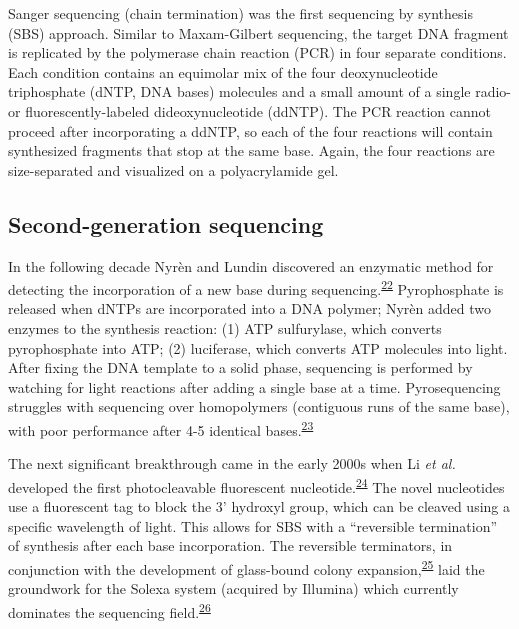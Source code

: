 \documentclass[11pt,letterpaper,oneside]{book}
\begin{document}
Sanger sequencing (chain termination) was the first sequencing by synthesis (SBS) approach.
Similar to Maxam-Gilbert sequencing, the target DNA fragment is replicated by the polymerase chain reaction (PCR) in four separate conditions.
Each condition contains an equimolar mix of the four deoxynucleotide triphosphate (dNTP, DNA bases) molecules and a small amount of a single radio- or fluorescently-labeled dideoxynucleotide (ddNTP).
The PCR reaction cannot proceed after incorporating a ddNTP, so each of the four reactions will contain synthesized fragments that stop at the same base.
Again, the four reactions are size-separated and visualized on a polyacrylamide gel.

\hypertarget{secGen}{%
\subsection{Second-generation sequencing}\label{secGen}}

In the following decade Nyrèn and Lundin discovered an enzymatic method for detecting the incorporation of a new base during sequencing.\textsuperscript{\protect\hyperlink{ref-nyren:1985aa}{22}}
Pyrophosphate is released when dNTPs are incorporated into a DNA polymer; Nyrèn added two enzymes to the synthesis reaction: (1) ATP sulfurylase, which converts pyrophosphate into ATP; (2) luciferase, which converts ATP molecules into light.
After fixing the DNA template to a solid phase, sequencing is performed by watching for light reactions after adding a single base at a time.
Pyrosequencing struggles with sequencing over homopolymers (contiguous runs of the same base), with poor performance after 4-5 identical bases.\textsuperscript{\protect\hyperlink{ref-ronaghi:1998aa}{23}}

The next significant breakthrough came in the early 2000s when Li \emph{et al.} developed the first photocleavable fluorescent nucleotide.\textsuperscript{\protect\hyperlink{ref-li:2003aa}{24}}
The novel nucleotides use a fluorescent tag to block the 3' hydroxyl group, which can be cleaved using a specific wavelength of light.
This allows for SBS with a ``reversible termination'' of synthesis after each base incorporation.
The reversible terminators, in conjunction with the development of glass-bound colony expansion,\textsuperscript{\protect\hyperlink{ref-fedurco:2006aa}{25}} laid the groundwork for the Solexa system (acquired by Illumina) which currently dominates the sequencing field.\textsuperscript{\protect\hyperlink{ref-turcatti:2008aa}{26}}
\end{document}

